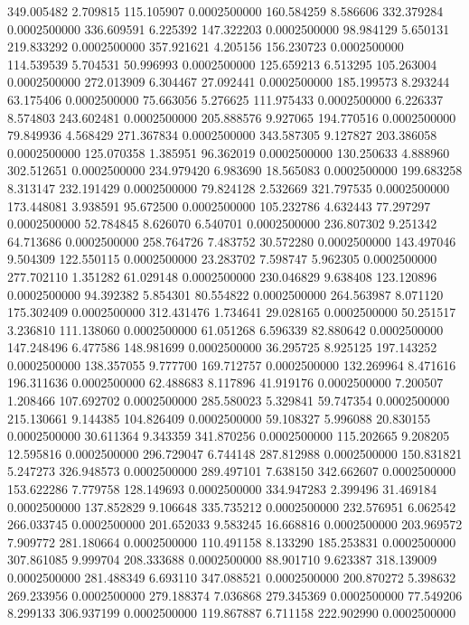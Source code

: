 349.005482 2.709815 115.105907 0.0002500000
160.584259 8.586606 332.379284 0.0002500000
336.609591 6.225392 147.322203 0.0002500000
98.984129 5.650131 219.833292 0.0002500000
357.921621 4.205156 156.230723 0.0002500000
114.539539 5.704531 50.996993 0.0002500000
125.659213 6.513295 105.263004 0.0002500000
272.013909 6.304467 27.092441 0.0002500000
185.199573 8.293244 63.175406 0.0002500000
75.663056 5.276625 111.975433 0.0002500000
6.226337 8.574803 243.602481 0.0002500000
205.888576 9.927065 194.770516 0.0002500000
79.849936 4.568429 271.367834 0.0002500000
343.587305 9.127827 203.386058 0.0002500000
125.070358 1.385951 96.362019 0.0002500000
130.250633 4.888960 302.512651 0.0002500000
234.979420 6.983690 18.565083 0.0002500000
199.683258 8.313147 232.191429 0.0002500000
79.824128 2.532669 321.797535 0.0002500000
173.448081 3.938591 95.672500 0.0002500000
105.232786 4.632443 77.297297 0.0002500000
52.784845 8.626070 6.540701 0.0002500000
236.807302 9.251342 64.713686 0.0002500000
258.764726 7.483752 30.572280 0.0002500000
143.497046 9.504309 122.550115 0.0002500000
23.283702 7.598747 5.962305 0.0002500000
277.702110 1.351282 61.029148 0.0002500000
230.046829 9.638408 123.120896 0.0002500000
94.392382 5.854301 80.554822 0.0002500000
264.563987 8.071120 175.302409 0.0002500000
312.431476 1.734641 29.028165 0.0002500000
50.251517 3.236810 111.138060 0.0002500000
61.051268 6.596339 82.880642 0.0002500000
147.248496 6.477586 148.981699 0.0002500000
36.295725 8.925125 197.143252 0.0002500000
138.357055 9.777700 169.712757 0.0002500000
132.269964 8.471616 196.311636 0.0002500000
62.488683 8.117896 41.919176 0.0002500000
7.200507 1.208466 107.692702 0.0002500000
285.580023 5.329841 59.747354 0.0002500000
215.130661 9.144385 104.826409 0.0002500000
59.108327 5.996088 20.830155 0.0002500000
30.611364 9.343359 341.870256 0.0002500000
115.202665 9.208205 12.595816 0.0002500000
296.729047 6.744148 287.812988 0.0002500000
150.831821 5.247273 326.948573 0.0002500000
289.497101 7.638150 342.662607 0.0002500000
153.622286 7.779758 128.149693 0.0002500000
334.947283 2.399496 31.469184 0.0002500000
137.852829 9.106648 335.735212 0.0002500000
232.576951 6.062542 266.033745 0.0002500000
201.652033 9.583245 16.668816 0.0002500000
203.969572 7.909772 281.180664 0.0002500000
110.491158 8.133290 185.253831 0.0002500000
307.861085 9.999704 208.333688 0.0002500000
88.901710 9.623387 318.139009 0.0002500000
281.488349 6.693110 347.088521 0.0002500000
200.870272 5.398632 269.233956 0.0002500000
279.188374 7.036868 279.345369 0.0002500000
77.549206 8.299133 306.937199 0.0002500000
119.867887 6.711158 222.902990 0.0002500000
